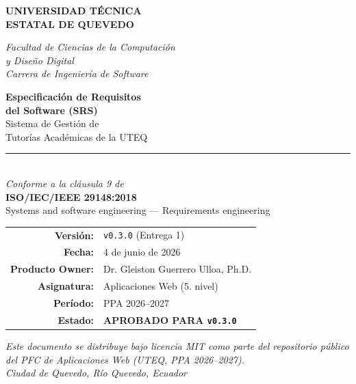 \documentclass[11pt,a4paper,twoside]{report}
\begin{document}
\begin{titlepage}
    \begin{center}
        \vspace*{1.5cm}

        {\color{uteqverde}\Huge\bfseries\uppercase{Universidad T\'ecnica}\\[4pt]
        \uppercase{Estatal de Quevedo}}

        \vspace{0.4cm}
        {\color{uteqdorado}\Large\itshape Facultad de Ciencias de la Computaci\'on\\ y Dise\~no Digital}\\[4pt]
        {\color{uteqdorado}\Large\itshape Carrera de Ingenier\'ia de Software}

        \vspace{2.5cm}

        {\huge\bfseries\color{uteqverde} Especificaci\'on de Requisitos\\[4pt] del Software (SRS)}\\[24pt]

        {\LARGE Sistema de Gesti\'on de\\[3pt] Tutor\'ias Acad\'emicas de la UTEQ}\\[10pt]

        \rule{0.6\textwidth}{1pt}\\[10pt]

        {\Large\itshape Conforme a la cl\'ausula 9 de}\\[3pt]
        {\Large\bfseries ISO/IEC/IEEE 29148:2018}\\[6pt]
        {\normalsize Systems and software engineering --- Requirements engineering}\\[24pt]

        \begin{tabular}{rl}
            \bfseries Versi\'on:            & \texttt{v0.3.0} (Entrega 1) \\[3pt]
            \bfseries Fecha:                & 4 de junio de 2026 \\[3pt]
            \bfseries Producto Owner:       & Dr. Gleiston Guerrero Ulloa, Ph.D. \\[3pt]
            \bfseries Asignatura:           & Aplicaciones Web (5.\textordmasculine{} nivel) \\[3pt]
            \bfseries Per\'iodo:            & PPA 2026--2027 \\[3pt]
            \bfseries Estado:               & \textcolor{uteqverde}{\bfseries APROBADO PARA \texttt{v0.3.0}} \\
        \end{tabular}

        \vfill

        {\small\itshape Este documento se distribuye bajo licencia MIT como parte del repositorio p\'ublico\\ del PFC de Aplicaciones Web (UTEQ, PPA 2026--2027).}\\[6pt]
        {\small\itshape Ciudad de Quevedo, R\'io Quevedo, Ecuador}

    \end{center}
\end{titlepage}
\end{document}
